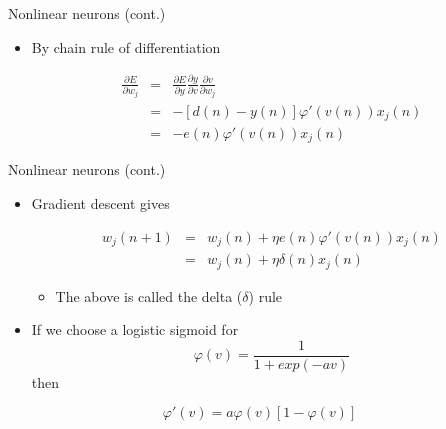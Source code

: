 \documentclass[notes]{beamer}
\providecommand{\tightlist}{%
  \setlength{\itemsep}{0pt}\setlength{\parskip}{0pt}}
\begin{document}
\begin{frame}{Nonlinear neurons (cont.)}

\begin{itemize}
\tightlist
\item
  By chain rule of differentiation

  \begin{eqnarray*}
  \frac{\partial E}{\partial w_j} &=&
   \frac{\partial E}{\partial y}\frac{\partial y}{\partial v}\frac{\partial v}{\partial w_j} \\ 
  &=& - [d (n) - y (n)]\varphi' \left(v(n) \right)x_ j (n) \\ 
  &=& - e(n) \varphi' (v(n) ) x_ j (n)
  \end{eqnarray*}
\end{itemize}

\end{frame}

\begin{frame}{Nonlinear neurons (cont.)}

\begin{itemize}
\tightlist
\item
  Gradient descent gives

  \begin{eqnarray*}
     w _j (n + 1) &=& w_ j (n) +\eta e(n)\varphi' (v(n)) x _j (n) \\ 
                       &=& w_ j (n) +\eta \delta (n) x_ j (n) 
     \end{eqnarray*}

  \begin{itemize}
  \tightlist
  \item
    The above is called the delta (\(\delta\)) rule
  \end{itemize}
\item
  If we choose a logistic sigmoid for
  \[                    \varphi (v) = \frac{1}{  1+ exp( - av )} \] then
\end{itemize}

\[                   \varphi '      ( v ) = a \varphi ( v )[1-\varphi   ( v )]   \]

\end{frame}
\end{document}
